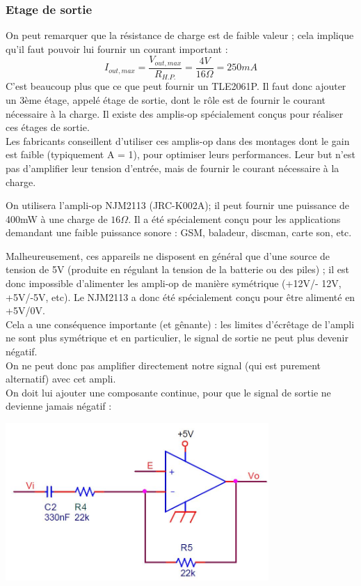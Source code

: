 \documentclass{../template/labo}
\begin{document}
\subsubsection{Etage de sortie}
On peut remarquer que la résistance de charge est de faible valeur ; cela implique qu'il faut pouvoir lui fournir un courant important :
$$I_{out,max}=\frac{V_{out,max}}{R_{H.P.}}=\frac{4V}{16\Omega}=250mA$$
C'est beaucoup plus que ce que peut fournir un TLE2061P. Il faut donc ajouter un 3ème étage, appelé étage de sortie, dont le rôle est de fournir le courant nécessaire à la charge. Il existe des amplis-op spécialement conçus pour réaliser ces étages de sortie.\\
Les fabricants conseillent d'utiliser ces amplis-op dans des montages dont le gain est faible (typiquement A = 1), pour optimiser leurs performances. Leur but n'est pas d'amplifier leur tension d'entrée, mais de fournir le courant
nécessaire à la charge.

On utilisera l'ampli-op NJM2113 (JRC-K002A); il peut fournir une puissance de 400mW à une charge de $16\Omega$. Il a été spécialement conçu pour les applications demandant une faible puissance sonore : GSM, baladeur, discman, carte son, etc.

Malheureusement, ces appareils ne disposent en général que d'une source de tension de 5V (produite en régulant la tension de la batterie ou des piles) ; il est donc impossible d'alimenter les ampli-op de manière symétrique (+12V/- 12V, +5V/-5V, etc). Le NJM2113 a donc été spécialement conçu pour être alimenté en +5V/0V.\\
Cela a une conséquence importante (et gênante) : les limites d'écrêtage de l'ampli ne sont plus symétrique et en particulier, le signal de sortie ne peut plus devenir négatif.\\
On ne peut donc pas amplifier directement notre signal (qui est purement alternatif) avec cet ampli.\\
On doit lui ajouter une composante continue, pour que le signal de sortie ne devienne jamais négatif :
\begin{center}
\includegraphics[width=10cm]{figures/AOPetage3}
\end{center}
\end{document}
